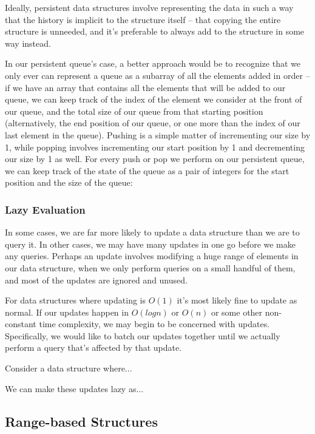 Ideally, persistent data structures involve representing the data in such a way that the history is implicit to the structure itself -- that copying the entire structure is unneeded, and it's preferable to always add to the structure in some way instead.

In our persistent queue's case, a better approach would be to recognize that we only ever can represent a queue as a subarray of all the elements added in order -- if we have an array that contains all the elements that will be added to our queue, we can keep track of the index of the element we consider at the front of our queue, and the total size of our queue from that starting position (alternatively, the end position of our queue, or one more than the index of our last element in the queue). Pushing is a simple matter of incrementing our size by 1, while popping involves incrementing our start position by 1 and decrementing our size by 1 as well. For every push or pop we perform on our persistent queue, we can keep track of the state of the queue as a pair of integers for the start position and the size of the queue:


\subsubsection{Lazy Evaluation}

In some cases, we are far more likely to update a data structure than we are to query it. In other cases, we may have many updates in one go before we make any queries. Perhaps an update involves modifying a huge range of elements in our data structure, when we only perform queries on a small handful of them, and most of the updates are ignored and unused.

For data structures where updating is $O(1)$ it's most likely fine to update as normal. If our updates happen in $O(log n)$ or $O(n)$ or some other non-constant time complexity, we may begin to be concerned with updates. Specifically, we would like to batch our updates together until we actually perform a query that's affected by that update.

Consider a data structure where...

We can make these updates lazy as...

\subsection{Range-based Structures}
 

